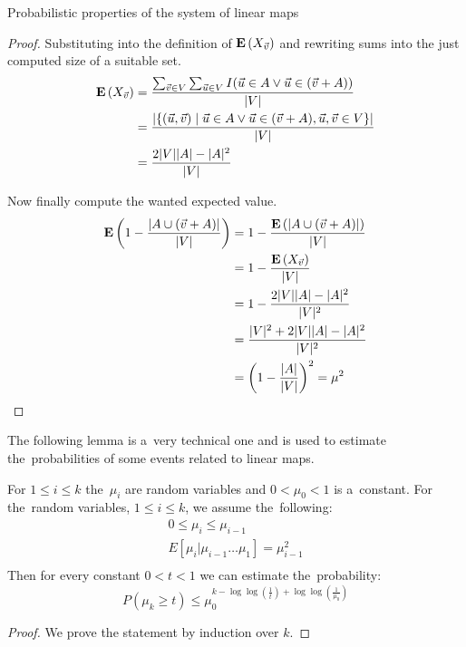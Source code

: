 \begin{section}{Probabilistic properties of the system of linear maps}
\begin{lemma}
\begin{proof}
Substituting into the definition of $\mathbf{E}\left(X_{\vec{v}}\right)$ and rewriting sums into the just computed size of a suitable set.
\[
\begin{split}
\mathbf{E}\left(X_{\vec{v}}\right) 
	& = \frac{\sum_{\vec{v} \in V} \sum_{\vec{u} \in V} I(\vec{u} \in A \vee \vec{u} \in (\vec{v} + A))}{|V|}  \\
	& = \frac{|\{(\vec{u}, \vec{v}) \mid \vec{u} \in A \vee \vec{u} \in (\vec{v} + A), \vec{u}, \vec{v} \in V \}|}{|V|} \\ 
	& = \frac{2|V||A| - |A|^2}{|V|} \\
\end{split}
\]

Now finally compute the wanted expected value.
\[
\begin{split}
\mathbf{E}\left(1 - \frac{|A \cup (\vec{v} + A)|}{|V|}\right) 
	& = 1 - \frac{\mathbf{E}\left(|A \cup (\vec{v} + A)|\right)}{|V|}  \\
	& = 1 - \frac{\mathbf{E}\left(X_{\vec{v}}\right)}{|V|} \\
	& = 1 - \frac{2|V||A| - |A|^2}{|V|^2} \\
	& = \frac{|V|^2 + 2|V||A| - |A|^2}{|V|^2} \\
	& = \left(1 - \frac{|A|}{|V|}\right)^2 = \mu^2 \\
\end{split}
\]
\end{proof}
\end{lemma}

The following lemma is a~very technical one and is used to estimate the~probabilities of some events related to linear maps.
\begin{lemma}
\label{lemma-random-variable}
For $1 \leq i \leq k$ the~$\mu_i$ are random variables and $0 < \mu_0 < 1$ is a~constant. For the~random variables, $1 \leq i \leq k$, we assume the~following:
\begin{gather*}
0 \leq \mu_i \leq \mu_{i - 1} \\
E[ \mu_i | \mu_{i-1} \dots \mu_1 ] = \mu_{i-1}^{2} \\
\end{gather*}
Then for every constant $0 < t < 1$ we can estimate the~probability:
\begin{displaymath}
P(\mu_k \geq t) \leq \mu_0^{k - \log \log (\frac{1}{t}) + \log \log \left(\frac{1}{\mu_0}\right)}
\end{displaymath}
\end{lemma}
\begin{proof}
We prove the statement by induction over $k$. 


\end{proof}
\end{section}
